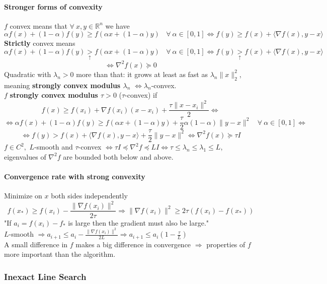 \documentclass[10pt]{report}
\begin{document}
\paragraph{Stronger forms of convexity}
$f$ convex means that $\forall\:x,y\in \mathbb{R}^n$ we have $$\alpha f(x) + (1-\alpha)f(y)\geq f(\alpha x+ (1-\alpha)y)\:\:\:\:\forall\:\alpha\in[0,1] \Leftrightarrow f(y)\geq f(x) + \langle \nabla f(x), y-x\rangle$$
\textbf{Strictly} convex means $$\alpha f(x) + (1-\alpha)f(y)\underset{\uparrow}{>} f(\alpha x+ (1-\alpha)y)\:\:\:\:\forall\:\alpha\in[0,1] \Leftrightarrow f(y)\underset{\uparrow}{>} f(x) + \langle \nabla f(x), y-x\rangle$$
$$\Leftrightarrow\nabla^2f(x)\succeq 0$$
Quadratic with $\lambda_n > 0$ more than that: it grows at least as fast as $\lambda_n\|x\|_2^2$, meaning \textbf{strongly convex modulus $\lambda_n$} $\Leftrightarrow \lambda_n$-convex.\\
$f$ \textbf{strongly convex modulus $\tau > 0$} ($\tau$-convex) if $$f(x)\geq f(x_i)+\nabla f(x_i)(x-x_i)+\frac{\tau\|x-x_i\|^2}{2}\Leftrightarrow$$ $$\Leftrightarrow\alpha f(x) + (1-\alpha)f(y)\geq f(\alpha x+ (1-\alpha)y)+\frac{\tau}{2}\alpha(1-\alpha)\|y-x\|^2\:\:\:\:\forall\:\alpha\in[0,1] \Leftrightarrow$$ $$\Leftrightarrow f(y)> f(x) + \langle \nabla f(x), y-x\rangle+\frac{\tau}{2}\|y-x\|^2 \Leftrightarrow\nabla^2 f(x) \succeq \tau I$$
$f \in C^2,$ $L$-smooth and $\tau$-convex $\Leftrightarrow \tau I \preceq \nabla^2 f\preceq LI \Leftrightarrow \tau \leq \lambda_n \leq \lambda_1 \leq L$, eigenvalues of $\nabla^2 f$ are bounded both below and above.
\paragraph{Convergence rate with strong convexity} Minimize on $x$ both sides independently $$f(x_*)\geq f(x_i) - \frac{\|\nabla f(x_i)\|^2}{2\tau} \Rightarrow \|\nabla f(x_i)\|^2\geq 2\tau(f(x_i)-f(x_*))$$
"If $a_i = f(x_i) - f_*$ is large then the gradient must also be large."\\
$L$-smooth $\Rightarrow a_{i+1}\leq a_i - \frac{\|\nabla f(x_i)\|^2}{2L} \Rightarrow a_{i+1}\leq a_i(1-\frac{\tau}{L})$\\
A small difference in $f$ makes a big difference in convergence $\Rightarrow$ properties of $f$ more important than the algorithm.
\subsubsection{Inexact Line Search}
\end{document}
